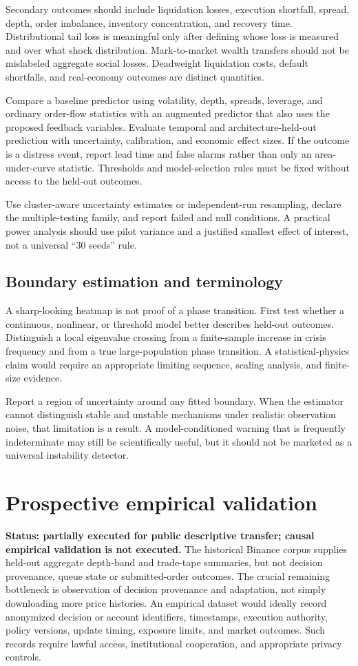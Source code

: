 \documentclass[11pt,a4paper]{article}
\theoremstyle{definition}
\theoremstyle{remark}
\begin{document}
Secondary outcomes should include liquidation losses, execution shortfall, spread, depth, order imbalance, inventory concentration, and recovery time. Distributional tail loss is meaningful only after defining whose loss is measured and over what shock distribution. Mark-to-market wealth transfers should not be mislabeled aggregate social losses. Deadweight liquidation costs, default shortfalls, and real-economy outcomes are distinct quantities.

Compare a baseline predictor using volatility, depth, spreads, leverage, and ordinary order-flow statistics with an augmented predictor that also uses the proposed feedback variables. Evaluate temporal and architecture-held-out prediction with uncertainty, calibration, and economic effect sizes. If the outcome is a distress event, report lead time and false alarms rather than only an area-under-curve statistic. Thresholds and model-selection rules must be fixed without access to the held-out outcomes.

Use cluster-aware uncertainty estimates or independent-run resampling, declare the multiple-testing family, and report failed and null conditions. A practical power analysis should use pilot variance and a justified smallest effect of interest, not a universal ``30 seeds'' rule.

\subsection{Boundary estimation and terminology}
A sharp-looking heatmap is not proof of a phase transition. First test whether a continuous, nonlinear, or threshold model better describes held-out outcomes. Distinguish a local eigenvalue crossing from a finite-sample increase in crisis frequency and from a true large-population phase transition. A statistical-physics claim would require an appropriate limiting sequence, scaling analysis, and finite-size evidence.

Report a region of uncertainty around any fitted boundary. When the estimator cannot distinguish stable and unstable mechanisms under realistic observation noise, that limitation is a result. A model-conditioned warning that is frequently indeterminate may still be scientifically useful, but it should not be marketed as a universal instability detector.

\section{Prospective empirical validation}
\label{sec:empirical}
\textbf{Status: partially executed for public descriptive transfer; causal empirical validation is not executed.} The historical Binance corpus supplies held-out aggregate depth-band and trade-tape summaries, but not decision provenance, queue state or submitted-order outcomes. The crucial remaining bottleneck is observation of decision provenance and adaptation, not simply downloading more price histories. An empirical dataset would ideally record anonymized decision or account identifiers, timestamps, execution authority, policy versions, update timing, exposure limits, and market outcomes. Such records require lawful access, institutional cooperation, and appropriate privacy controls.
\end{document}
